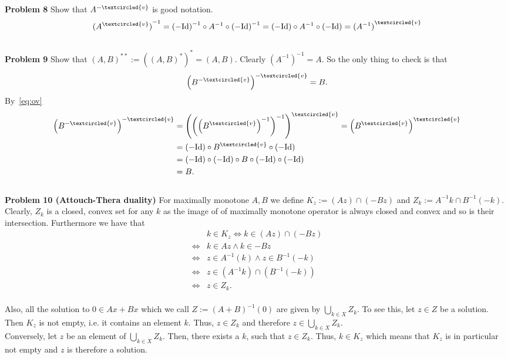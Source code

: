 \documentclass{scrartcl}
\theoremstyle{plain}
\theoremstyle{remark}
\newcommand{\Id}{\textup{Id}}
\newcommand{\ov}{\textcircled{v}}
\begin{document}
\textbf{Problem 8} Show that $A^{-\ov}$ is good notation.
\begin{equation}
  \label{eq:ov}
  {(A^{\ov})}^{-1} = {(-\Id)}^{-1} \circ A^{-1} \circ {(-\Id)}^{-1} = (-\Id) \circ A^{-1} \circ (-\Id) = {(A^{-1})}^{\ov}
\end{equation}\\

\textbf{Problem 9} Show that ${(A, B)}^{**} := {({(A, B)}^*)}^* = {(A, B)}$.
Clearly ${(A^{-1})}^{-1} = A$. So the only thing to check is that
\begin{equation}
  {\left(B^{-\ov}\right)}^{-\ov} = B.
\end{equation}
By~\eqref{eq:ov}
\begin{equation}
  \begin{aligned}
    {\left(B^{-\ov}\right)}^{-\ov} &= {\left({\left({\left(B^{\ov}\right)}^{-1}\right)}^{-1}\right)}^{\ov} = {\left(B^{\ov}\right)}^{\ov}\\
    &= {(-\Id)} \circ B^{\ov} \circ {(-\Id)} \\
    &= {(-\Id)} \circ {(-\Id)} \circ B \circ {(-\Id)} \circ {(-\Id)} \\
    &= B.
  \end{aligned}
\end{equation}\\

\textbf{Problem 10 (Attouch-Thera duality)} For maximally monotone $A,B$ we define $K_{z} := (Az) \cap (-Bz)$ and $Z_{k} := A^{-1}k \cap B^{-1}(-k)$. Clearly, $Z_{k}$ is a closed, convex set for any $k$ as the image of of maximally monotone operator is always closed and convex and so is their intersection.
Furthermore we have that
\begin{equation}
  \begin{aligned}
    & k \in K_{z} \Leftrightarrow k \in (Az) \cap (-Bz) \\
    \Leftrightarrow& k \in Az \wedge k \in -Bz \\
    \Leftrightarrow& z \in A^{-1}(k) \wedge z \in B^{-1}(-k) \\
    \Leftrightarrow& z \in (A^{-1}k) \cap (B^{-1}(-k)) \\
    \Leftrightarrow& z \in Z_{k}.
  \end{aligned}
\end{equation}\\
Also, all the solution to $0 \in Ax + Bx$ which we call $Z:= {(A + B)}^{-1}(0)$ are given by $\bigcup_{k \in X} Z_{k}$. To see this, let $z \in Z$ be a solution. Then $K_{z}$ is not empty, i.e. it contains an element $k$. 
Thus, $z \in Z_{k}$ and therefore $z \in \bigcup_{k \in X} Z_{k}$.\\
Conversely, let $z$ be an element of $\bigcup_{k \in X} Z_{k}$. Then, there exists a $k$, such that $z \in Z_{k}$. Thus, $k \in K_{z}$ which means that $K_{z}$ is in particular not empty and $z$ is therefore a solution.
\end{document}
